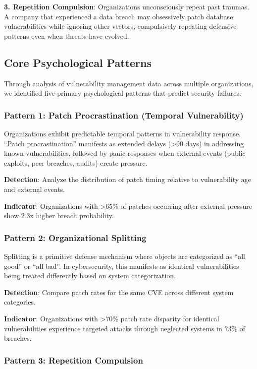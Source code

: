 \documentclass[11pt,a4paper]{article}
\begin{document}
\textbf{3. Repetition Compulsion}: Organizations unconsciously repeat past traumas\cite{freud1920}. A company that experienced a data breach may obsessively patch database vulnerabilities while ignoring other vectors, compulsively repeating defensive patterns even when threats have evolved.

\subsection{Core Psychological Patterns}

Through analysis of vulnerability management data across multiple organizations, we identified five primary psychological patterns that predict security failures:

\subsubsection{Pattern 1: Patch Procrastination (Temporal Vulnerability)}

Organizations exhibit predictable temporal patterns in vulnerability response. ``Patch procrastination'' manifests as extended delays (>90 days) in addressing known vulnerabilities, followed by panic responses when external events (public exploits, peer breaches, audits) create pressure.

\textbf{Detection}: Analyze the distribution of patch timing relative to vulnerability age and external events.

\textbf{Indicator}: Organizations with >65\% of patches occurring after external pressure show 2.3x higher breach probability.

\subsubsection{Pattern 2: Organizational Splitting}

Splitting is a primitive defense mechanism where objects are categorized as ``all good'' or ``all bad''\cite{klein1946}. In cybersecurity, this manifests as identical vulnerabilities being treated differently based on system categorization.

\textbf{Detection}: Compare patch rates for the same CVE across different system categories.

\textbf{Indicator}: Organizations with >70\% patch rate disparity for identical vulnerabilities experience targeted attacks through neglected systems in 73\% of breaches.

\subsubsection{Pattern 3: Repetition Compulsion}
\end{document}

